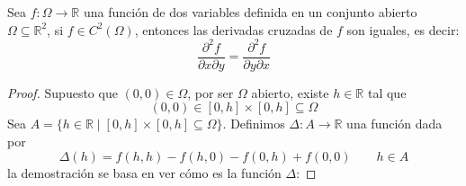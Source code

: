 \begin{teo}[de Clairaut]
    Sea $f:\Omega \rightarrow \mathbb{R}$ una función de dos variables definida en un conjunto abierto $\Omega\subseteq \mathbb{R}^2$, si $f\in C^2(\Omega)$, entonces las derivadas cruzadas de $f$ son iguales, es decir:
    \begin{equation*}
        \dfrac{\partial^2 f}{\partial x\partial y} = \dfrac{\partial^2 f}{\partial y\partial x}
    \end{equation*}
    \begin{proof}
        Supuesto que $(0,0)\in \Omega$, por ser $\Omega$ abierto, existe $h\in \mathbb{R}$ tal que
        \begin{equation*}
            (0,0) \in [0,h]\times [0,h] \subseteq \Omega
        \end{equation*}
        Sea $A = \{h\in \mathbb{R}\mid [0,h]\times [0,h]\subseteq \Omega\}$. Definimos $\Delta:A\rightarrow\mathbb{R}$ una función dada por
        \begin{equation*}
            \Delta(h) = f(h,h) - f(h,0) - f(0,h) + f(0,0) \qquad h\in A
        \end{equation*}
        la demostración se basa en ver cómo es la función $\Delta$:


\end{proof}
\end{teo}
